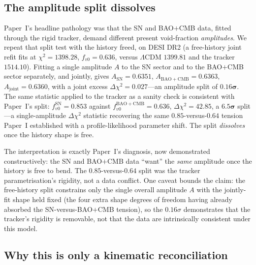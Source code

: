 \documentclass[aps,prd,twocolumn,nofootinbib,superscriptaddress,floatfix]{revtex4-2}
\newcommand{\fvo}{f_{v0}}
\newcommand{\Lcdm}{\Lambda\mathrm{CDM}}
\begin{document}
\subsection{The amplitude split dissolves}
\label{subsec:ampsplit}

Paper~I's headline pathology was that the SN and BAO$+$CMB data, fitted through
the rigid tracker, demand different present void-fraction \emph{amplitudes}. We
repeat that split test with the history freed, on DESI DR2 (a free-history joint
refit fits at $\chi^2=1398.28$, $\fvo=0.636$, versus $\Lcdm$ $1399.81$ and the
tracker $1514.10$). Fitting a single amplitude $A$ to the SN sector and to the
BAO$+$CMB sector separately, and jointly, gives $A_{\mathrm{SN}}=0.6351$,
$A_{\mathrm{BAO+CMB}}=0.6363$, $A_{\mathrm{joint}}=0.6360$, with a joint
excess $\Delta\chi^2=0.027$---an amplitude split of $\boldsymbol{0.16\sigma}$.
The same statistic applied to the tracker as a sanity check is consistent with
Paper~I's split: $\fvo^{\mathrm{SN}}=0.853$ against
$\fvo^{\mathrm{BAO+CMB}}=0.636$, $\Delta\chi^2=42.85$, a
$\boldsymbol{6.5\sigma}$ split---a single-amplitude $\Delta\chi^2$ statistic
recovering the same $0.85$-versus-$0.64$ tension Paper~I established with a
profile-likelihood parameter shift. The split \emph{dissolves} once the history
shape is free.

The interpretation is exactly Paper~I's diagnosis, now demonstrated
constructively: the SN and BAO$+$CMB data ``want'' the \emph{same} amplitude once
the history is free to bend. The $0.85$-versus-$0.64$ split was the tracker
parametrisation's rigidity, not a data conflict. One caveat bounds the claim: the
free-history split constrains only the single overall amplitude $A$ with the
jointly-fit shape held fixed (the four extra shape degrees of freedom having
already absorbed the SN-versus-BAO$+$CMB tension), so the $0.16\sigma$
demonstrates that the tracker's rigidity is removable, not that the data are
intrinsically consistent under this model.

\subsection{Why this is only a kinematic reconciliation}
\label{subsec:kinematic}
\end{document}
